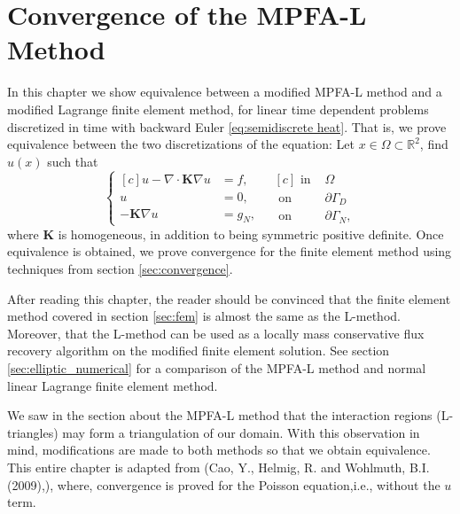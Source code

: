\documentclass[../Main/main.tex]{subfiles}
\begin{document}
	\chapter{Convergence of the MPFA-L Method}
	\graphicspath{{../Equivalence between MPFA-L and FEM/figs/}}
	In this chapter we show equivalence between a modified MPFA-L method and a modified Lagrange finite element method, for linear time dependent problems discretized in time with backward Euler  \eqref{eq:semidiscrete heat}.
	 That is, we prove equivalence between the two discretizations  of the equation: Let $x\in \Omega \subset \mathbb{R}^2$, find $u(x)$ such that
	\begin{equation}\label{eq:stationary_heat}
	\left \{
	\begin{aligned}[c]
		u - \nabla \cdot\bm{K} \nabla u &= f, \\
		u &= 0, \\
		-\pmb{K}\nabla u &= g_N,
	\end{aligned}
	\ \ \
	\begin{aligned}[c]
		\text{ in }& \Omega \\
		\text{ on }& \partial \Gamma_D \\
		\text{ on }& \partial \Gamma_N ,
	\end{aligned}
	\right.
	\end{equation}
	where $\bm{K}$ is homogeneous, in addition to being symmetric positive definite.
	Once equivalence is obtained, we prove convergence for the finite element method using techniques from section \ref{sec:convergence}. 
	\par
	After reading this chapter, the reader should be convinced that the finite element method covered in section \ref{sec:fem} is almost the same as the L-method. Moreover, that the L-method can be used as a locally mass conservative flux recovery algorithm on the modified finite element solution. See section \ref{sec:elliptic_numerical} for a comparison of the MPFA-L method and normal linear Lagrange finite element method.
	\par
	We saw in the section about the MPFA-L method that the interaction regions (L-triangles) may form a triangulation of our domain.
	With this observation in mind, modifications are made to both methods so that we obtain equivalence. This entire chapter is adapted from (Cao, Y., Helmig, R. and Wohlmuth, B.I. (2009),\cite{https://doi.org/10.1002/num.20525}), where, convergence is proved for the Poisson equation,i.e., without the $u$ term.
\end{document}
